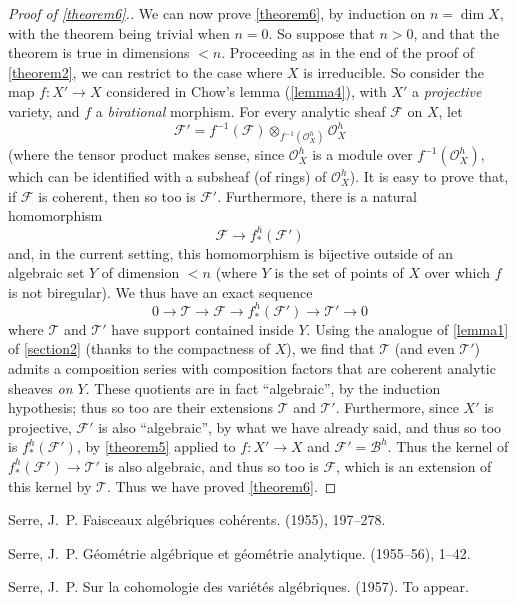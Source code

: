 \documentclass{article}
\theoremstyle{plain}
\theoremstyle{definition}
\newcommand{\sh}{\mathscr}
\newcommand{\oldpage}[1]{\marginpar{\footnotesize$\Big\vert$ \textit{p.~#1}}}
\begin{document}
\begin{proof}[Proof of \cref{theorem6}.]
  We can now prove \cref{theorem6}, by induction on $n=\dim X$, with the theorem being trivial when $n=0$.
  So suppose that $n>0$, and that the theorem is true in dimensions $<n$.
  Proceeding as in the end of the proof of \cref{theorem2}, we can restrict to the case where $X$ is irreducible.
  So consider the map $f\colon X'\to X$ considered in Chow's lemma (\cref{lemma4}), with $X'$ a \emph{projective} variety, and $f$ a \emph{birational} morphism.
  For every analytic sheaf $\sh{F}$ on $X$, let
  \[
    \sh{F}' = f^{-1}(\sh{F})\otimes_{f^{-1}(\sh{O}_X^h)}\sh{O}_X^h
  \]
  (where the tensor product makes sense, since $\sh{O}_X^h$ is a module over $f^{-1}(\sh{O}_X^h)$, which can be identified with a subsheaf (of rings) of $\sh{O}_X^h$).
  It is easy to prove that, if $\sh{F}$ is coherent, then so too is $\sh{F}'$.
  Furthermore, there is a natural homomorphism
  \oldpage{2-16}
  \[
    \sh{F} \to f_*^h(\sh{F}')
  \]
  and, in the current setting, this homomorphism is bijective outside of an algebraic set $Y$ of dimension $<n$ (where $Y$ is the set of points of $X$ over which $f$ is not biregular).
  We thus have an exact sequence
  \[
    0 \to \sh{T} \to \sh{F} \to f_*^h(\sh{F}') \to \sh{T}' \to 0
  \]
  where $\sh{T}$ and $\sh{T'}$ have support contained inside $Y$.
  Using the analogue of \cref{lemma1} of \cref{section2} (thanks to the compactness of $X$), we find that $\sh{T}$ (and even $\sh{T}'$) admits a composition series with composition factors that are coherent analytic sheaves \emph{on $Y$}.
  These quotients are in fact ``algebraic'', by the induction hypothesis;
  thus so too are their extensions $\sh{T}$ and $\sh{T}'$.
  Furthermore, since $X'$ is projective, $\sh{F}'$ is also ``algebraic'', by what we have already said, and thus so too is $f_*^h(\sh{F}')$, by \cref{theorem5} applied to $f\colon X'\to X$ and $\sh{F}'=\sh{B}^h$.
  Thus the kernel of $f_*^h(\sh{F}')\to\sh{T}'$ is also algebraic, and thus so too is $\sh{F}$, which is an extension of this kernel by $\sh{T}$.
  Thus we have proved \cref{theorem6}.
\end{proof}



\nocite{*}

\begin{thebibliography}{1}

  {\sc Serre, J.~P.}
  \newblock Faisceaux algébriques cohérents.
   (1955), 197--278.

  {\sc Serre, J.~P.}
  \newblock Géométrie algébrique et géométrie analytique.
   (1955--56), 1--42.

  {\sc Serre, J.~P.}
  \newblock Sur la cohomologie des variétés algébriques.
   (1957).
  \newblock To appear.

\end{thebibliography}
\end{document}
